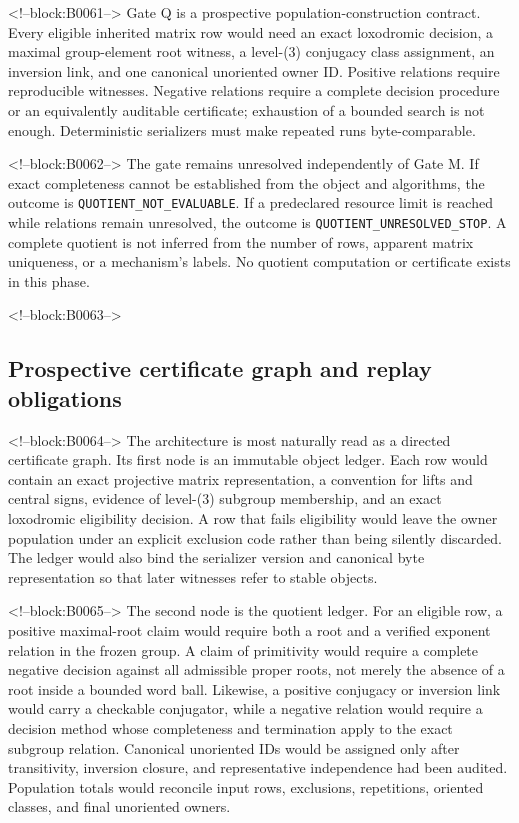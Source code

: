 \documentclass[11pt,a4paper]{article}
\begin{document}
<!--block:B0061-->
Gate Q is a prospective population-construction contract. Every eligible inherited matrix row would need an exact loxodromic decision, a maximal group-element root witness, a level-(3) conjugacy class assignment, an inversion link, and one canonical unoriented owner ID. Positive relations require reproducible witnesses. Negative relations require a complete decision procedure or an equivalently auditable certificate; exhaustion of a bounded search is not enough. Deterministic serializers must make repeated runs byte-comparable.

<!--block:B0062-->
The gate remains unresolved independently of Gate M. If exact completeness cannot be established from the object and algorithms, the outcome is \texttt{QUOTIENT\_NOT\_EVALUABLE}. If a predeclared resource limit is reached while relations remain unresolved, the outcome is \texttt{QUOTIENT\_UNRESOLVED\_STOP}. A complete quotient is not inferred from the number of rows, apparent matrix uniqueness, or a mechanism's labels. No quotient computation or certificate exists in this phase.

<!--block:B0063-->
\subsection{Prospective certificate graph and replay obligations}

<!--block:B0064-->
The architecture is most naturally read as a directed certificate graph. Its first node is an immutable object ledger. Each row would contain an exact projective matrix representation, a convention for lifts and central signs, evidence of level-(3) subgroup membership, and an exact loxodromic eligibility decision. A row that fails eligibility would leave the owner population under an explicit exclusion code rather than being silently discarded. The ledger would also bind the serializer version and canonical byte representation so that later witnesses refer to stable objects.

<!--block:B0065-->
The second node is the quotient ledger. For an eligible row, a positive maximal-root claim would require both a root and a verified exponent relation in the frozen group. A claim of primitivity would require a complete negative decision against all admissible proper roots, not merely the absence of a root inside a bounded word ball. Likewise, a positive conjugacy or inversion link would carry a checkable conjugator, while a negative relation would require a decision method whose completeness and termination apply to the exact subgroup relation. Canonical unoriented IDs would be assigned only after transitivity, inversion closure, and representative independence had been audited. Population totals would reconcile input rows, exclusions, repetitions, oriented classes, and final unoriented owners.
\end{document}
